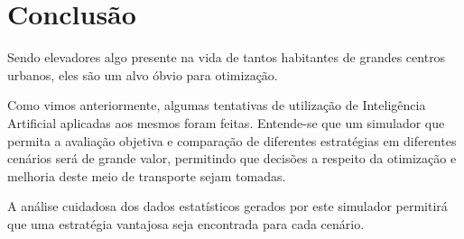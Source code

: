\chapter{\label{chap:conclusion}Conclusão}

Sendo elevadores algo presente na vida de tantos habitantes de grandes centros
urbanos, eles são um alvo óbvio para otimização.

Como vimos anteriormente, algumas tentativas de utilização de Inteligência
Artificial aplicadas aos mesmos foram feitas. Entende-se que um
simulador que permita a avaliação objetiva e comparação de diferentes
estratégias em diferentes cenários será de grande valor, permitindo que decisões
a respeito da otimização e melhoria deste meio de transporte sejam tomadas.

A análise cuidadosa dos dados estatísticos gerados por este simulador permitirá
que uma estratégia vantajosa seja encontrada para cada cenário.